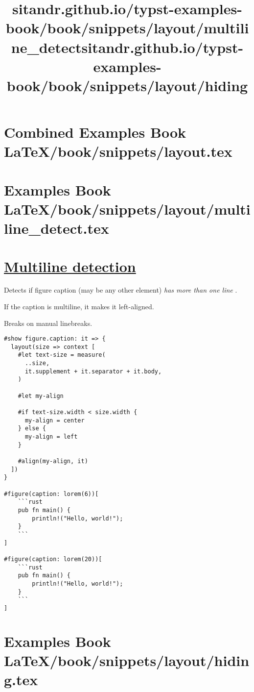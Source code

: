 \pandocbounded{}




\section{Combined Examples Book LaTeX/book/snippets/layout.tex}
\section{Examples Book LaTeX/book/snippets/layout/multiline_detect.tex}
\title{sitandr.github.io/typst-examples-book/book/snippets/layout/multiline_detect}

\section{\texorpdfstring{\hyperref[multiline-detection]{Multiline
detection}}{Multiline detection}}\label{multiline-detection}

Detects if figure caption (may be any other element) \emph{has more than
one line} .

If the caption is multiline, it makes it left-aligned.

Breaks on manual linebreaks.

\begin{verbatim}
#show figure.caption: it => {
  layout(size => context [
    #let text-size = measure(
      ..size,
      it.supplement + it.separator + it.body,
    )

    #let my-align

    #if text-size.width < size.width {
      my-align = center
    } else {
      my-align = left
    }

    #align(my-align, it)
  ])
}

#figure(caption: lorem(6))[
    ```rust
    pub fn main() {
        println!("Hello, world!");
    }
    ```
]

#figure(caption: lorem(20))[
    ```rust
    pub fn main() {
        println!("Hello, world!");
    }
    ```
]
\end{verbatim}

\pandocbounded{}


\section{Examples Book LaTeX/book/snippets/layout/hiding.tex}
\title{sitandr.github.io/typst-examples-book/book/snippets/layout/hiding}

